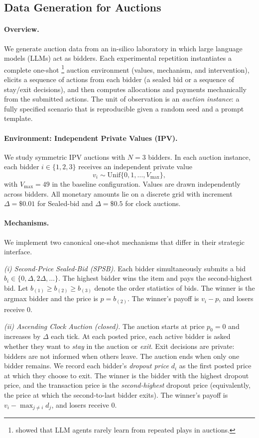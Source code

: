 \documentclass[format=acmsmall, review=false]{acmart}
\begin{document}
\subsection{Data Generation for Auctions} \label{sec:auction-data}

\paragraph{Overview.}
We generate auction data from an in-silico laboratory in which large language models (LLMs) act as bidders. 
Each experimental repetition instantiates a complete one-shot \footnote{\citet{zhu2024evidence} showed that LLM agents rarely learn from repeated plays in auctions.} auction environment (values, mechanism, and intervention), elicits a sequence of actions from each bidder (a sealed bid or a sequence of stay/exit decisions), and then computes allocations and payments mechanically from the submitted actions. 
The unit of observation is an \emph{auction instance}: a fully specified scenario that is reproducible given a random seed and a prompt template.

\paragraph{Environment: Independent Private Values (IPV).}
We study symmetric IPV auctions with $N=3$ bidders. In each auction instance, each bidder $i\in\{1,2,3\}$ receives an independent private value
\[
v_i \sim \mathrm{Unif}\{0,1,\dots,V_{\max}\},
\]
with $V_{\max}=49$ in the baseline configuration. Values are drawn independently across bidders. All monetary amounts lie on a discrete grid with increment $\Delta=\$0.01$ for Sealed-bid and $\Delta=\$0.5$ for clock auctions.

\paragraph{Mechanisms.}
We implement two canonical one-shot mechanisms that differ in their strategic interface.

\emph{(i) Second-Price Sealed-Bid (SPSB).}
Each bidder simultaneously submits a bid $b_i \in \{0,\Delta,2\Delta,\dots\}$. The highest bidder wins the item and pays the second-highest bid. Let $b_{(1)} \ge b_{(2)} \ge b_{(3)}$ denote the order statistics of bids. The winner is the argmax bidder and the price is $p=b_{(2)}$. The winner’s payoff is $v_i-p$, and losers receive $0$.

\emph{(ii) Ascending Clock Auction (closed).}
The auction starts at price $p_0=0$ and increases by $\Delta$ each tick. At each posted price, each active bidder is asked whether they want to \emph{stay} in the auction or \emph{exit}. Exit decisions are private: bidders are not informed when others leave. The auction ends when only one bidder remains. We record each bidder’s \emph{dropout price} $d_i$ as the first posted price at which they choose to exit. The winner is the bidder with the highest dropout price, and the transaction price is the \emph{second-highest} dropout price (equivalently, the price at which the second-to-last bidder exits). The winner’s payoff is $v_i-\max_{j\neq i} d_j$, and losers receive $0$.
\end{document}
